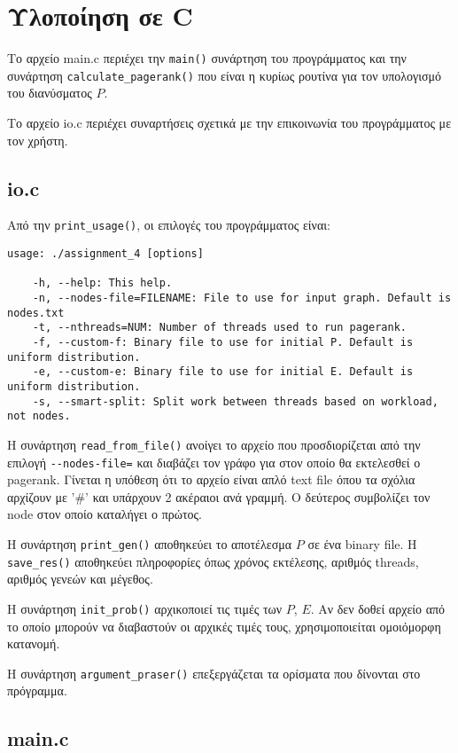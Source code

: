 \chapter{Υλοποίηση σε C}

Το αρχείο main.c περιέχει την \lstinline!main()! συνάρτηση του προγράμματος
και την συνάρτηση \lstinline!calculate_pagerank()!
που είναι η κυρίως ρουτίνα για τον υπολογισμό του διανύσματος $P$.

Το αρχείο io.c περιέχει συναρτήσεις σχετικά με την επικοινωνία του προγράμματος με τον χρήστη.

\section{io.c}
Από την \lstinline!print_usage()!, οι επιλογές του προγράμματος είναι:

\begin{verbatim}
usage: ./assignment_4 [options]

	-h, --help: This help.
	-n, --nodes-file=FILENAME: File to use for input graph. Default is nodes.txt
	-t, --nthreads=NUM: Number of threads used to run pagerank.
	-f, --custom-f: Binary file to use for initial P. Default is uniform distribution.
	-e, --custom-e: Binary file to use for initial E. Default is uniform distribution.
	-s, --smart-split: Split work between threads based on workload, not nodes.
\end{verbatim}

Η συνάρτηση \lstinline!read_from_file()! ανοίγει το αρχείο που προσδιορίζεται από την επιλογή \lstinline!--nodes-file=! και
διαβάζει τον γράφο για στον οποίο θα εκτελεσθεί ο pagerank.
Γίνεται η υπόθεση ότι το αρχείο είναι απλό text file όπου τα σχόλια αρχίζουν με '\#' και υπάρχουν
2 ακέραιοι ανά γραμμή. Ο δεύτερος συμβολίζει τον node στον οποίο καταλήγει ο πρώτος.

Η συνάρτηση \lstinline!print_gen()! αποθηκεύει το αποτέλεσμα $P$ σε ένα binary file.
Η \lstinline!save_res()! αποθηκεύει πληροφορίες όπως χρόνος εκτέλεσης, αριθμός threads, αριθμός γενεών και μέγεθος.

Η συνάρτηση \lstinline!init_prob()! αρχικοποιεί τις τιμές των $P$, $E$.
Αν δεν δοθεί αρχείο από το οποίο μπορούν να διαβαστούν οι αρχικές τιμές τους, χρησιμοποιείται ομοιόμορφη κατανομή.

Η συνάρτηση \lstinline!argument_praser()! επεξεργάζεται τα ορίσματα που δίνονται στο πρόγραμμα.

\section{main.c}

